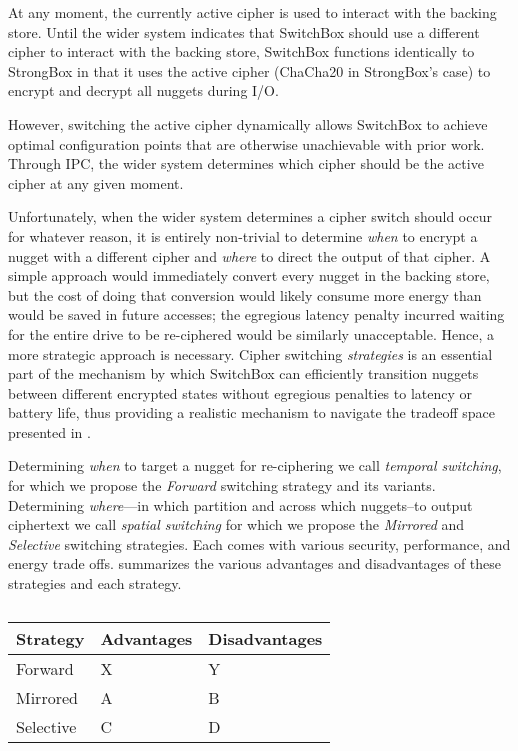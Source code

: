 At any moment, the currently active cipher is used to interact with the backing
store. Until the wider system indicates that SwitchBox should use a different
cipher to interact with the backing store, SwitchBox functions identically to
StrongBox in that it uses the active cipher (ChaCha20 in StrongBox's case) to
encrypt and decrypt all nuggets during I/O.

However, switching the active cipher dynamically allows SwitchBox to achieve
optimal configuration points that are otherwise unachievable with prior work.
Through IPC, the wider system determines which cipher should be the active
cipher at any given moment.

Unfortunately, when the wider system determines a cipher switch should occur for
whatever reason, it is entirely non-trivial to determine \emph{when} to
encrypt a nugget with a different cipher and \emph{where} to direct the
output of that cipher. A simple approach would immediately convert every nugget
in the backing store, but the cost of doing that conversion would likely consume
more energy than would be saved in future accesses; the egregious latency
penalty incurred waiting for the entire drive to be re-ciphered would be
similarly unacceptable. Hence, a more strategic approach is necessary. Cipher
switching \emph{strategies} is an essential part of the mechanism by which
SwitchBox can efficiently transition nuggets between different encrypted states
without egregious penalties to latency or battery life, thus providing a
realistic mechanism to navigate the tradeoff space presented in
.

Determining \emph{when} to target a nugget for re-ciphering we call
\emph{temporal switching}, for which we propose the \emph{Forward} switching
strategy and its variants. Determining \emph{where}---in which partition and
across which nuggets--to output ciphertext we call \emph{spatial switching} for
which we propose the \emph{Mirrored} and \emph{Selective} switching strategies.
Each comes with various security, performance, and energy trade offs.
 summarizes the various advantages and
disadvantages of these strategies and each strategy.

\begin{table}[]
   \begin{tabular}{@{}lll@{}}
   \toprule
   \textbf{Strategy} & \textbf{Advantages} & \textbf{Disadvantages} \\ \midrule
   Forward       & X      & Y \\
   Mirrored      & A     & B \\
   Selective     & C     & D \\
   \end{tabular}
   \caption{}
   \label{tbl:strategies-advantages}
\end{table}

